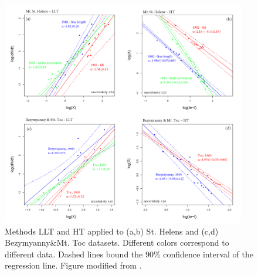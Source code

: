 \documentclass{article}
\begin{document}
\begin{figure}[H]
\centering
\includegraphics[width=0.95\textwidth]{Fig4_plus.png}
\vskip-0.5cm\caption{Methods LLT and HT applied to (a,b) St. Helens and (c,d) Bezymyanny\&Mt. Toc datasets. Different colors correspond to different data. Dashed lines bound the $90\%$ confidence interval of the regression line. Figure modified from \cite{Voight1988}.}
\label{Fig4}
\end{figure}
\end{document}
